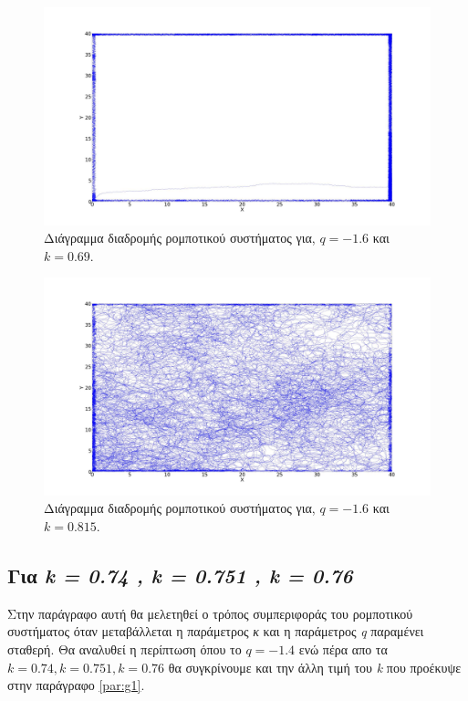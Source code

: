 \begin{figure}[ht]
	\centering
	\includegraphics[width=1\linewidth]{LateX images/log/k/g2-1.6}
	\caption{Διάγραμμα διαδρομής ρομποτικού συστήματος για, $q = -1.6$ και $k = 0.69$.}
	\label{f:g79}	
\end{figure}

\begin{figure}[ht]
	\centering
	\includegraphics[width=1\linewidth]{LateX images/log/k/g3-1.6}
	\caption{Διάγραμμα διαδρομής ρομποτικού συστήματος για, $q = -1.6$ και $k = 0.815$.}
	\label{f:g80}	
\end{figure}


\clearpage

\subsection{Για \emph{k = 0.74 , k = 0.751 , k = 0.76}}
\label{par:g3}
Στην παράγραφο αυτή θα μελετηθεί ο τρόπος συμπεριφοράς του ρομποτικού συστήματος όταν μεταβάλλεται η παράμετρος \emph{κ} και η παράμετρος \emph{q} παραμένει σταθερή. Θα αναλυθεί η περίπτωση όπου το $ q =-1.4$ ενώ πέρα απο τα $k = 0.74 , k = 0.751 , k = 0.76$ θα συγκρίνουμε και την άλλη τιμή του \emph{k} που προέκυψε στην παράγραφο \ref{par:g1}.

